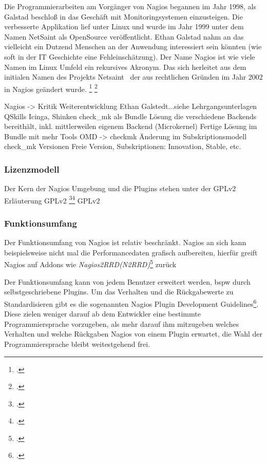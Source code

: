 \documentclass[12pt,a4paper,parskip]{scrreprt}
\begin{document}
	Die Programmierarbeiten am Vorgänger von Nagios begannen im Jahr 1998, als Galstad beschloß in das Geschäft mit Monitoringsystemen einzusteigen. Die verbesserte Applikation lief unter Linux und wurde im Jahr 1999 unter dem Namen NetSaint als OpenSource veröffentlicht. Ethan Galstad nahm an das vielleicht ein Dutzend Menschen an der Anwendung interessiert sein könnten (wie soft in der IT Geschichte eine Fehleinschätzung).
	Der Name Nagios ist wie viele Namen im Linux Umfeld ein rekursives Akronym. Das sich herleitet aus dem initialen Namen des Projekts \glqq Netsaint \grqq\ der aus rechtlichen Gründen im Jahr 2002 in Nagios geändert wurde. 
	\footcite{nagioshistory} \footcite{nagiosnamefaq}
	
	Nagios -> Kritik Weiterentwicklung Ethan Galstedt...siehe Lehrgangsunterlagen QSkills
	Icinga, Shinken
	check\_mk als Bundle Lösung die verschiedene Backends bereithält, inkl. mittlerweilen eigenem Backend (Microkernel)
	Fertige Lösung im Bundle mit mehr Tools
	OMD -> checkmk Änderung im Subskriptionsmodell
	check\_mk Versionen Freie Version, Subskriptionen: Innovation, Stable, etc.
	
	\subsubsection{Lizenzmodell}
	Der Kern der Nagios Umgebung und die Plugins stehen unter der GPLv2
	Erläuterung GPLv2 \footcite{gplv2de}\footcite{gplv2en}
	\gls{GPLv2}
	\subsubsection{Funktionsumfang}
	Der Funktionsumfang von Nagios ist relativ beschränkt. Nagios an sich kann beispielsweise nicht mal die Performancedaten grafisch aufbereiten, hierfür greift
	Nagios auf Addons wie \textit{Nagios2RRD(N2RRD)}\footcite{n2rrdprojecthome} zurück
	
	
	Der Funktionsumfang kann von jedem Benutzer erweitert werden, \acrlong{bspw} durch selbstgeschriebene Plugins. Um das Verhalten und die Rückgabewerte zu Standardisieren gibt es die sogenannten \glqq Nagios Plugin Development Guidelines\grqq\footcite{nagiospluginguidelines}. Diese zielen weniger darauf ab dem Entwickler eine bestimmte Programmiersprache vorzugeben, als mehr darauf ihm mitzugeben welches Verhalten und welche Rückgaben Nagios von einem Plugin erwartet, die Wahl der Programmiersprache bleibt weitestgehend frei.
\end{document}
